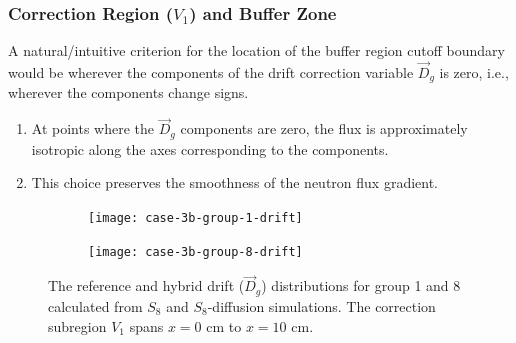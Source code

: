 \begin{frame}
  \frametitle{Correction Region ($V_1$) and Buffer Zone}

  A natural/intuitive criterion for the location of the buffer region cutoff boundary
  would be wherever the components of the drift correction variable $\vec{D}_g$ is zero, i.e.,
  wherever the components change signs.
  \begin{enumerate}
    \item At points where the $\vec{D}_g$ components are zero, the flux is approximately isotropic
      along the axes corresponding to the components.
    \item This choice preserves the smoothness of the neutron flux gradient.
  \end{enumerate}
  \begin{figure}[htb!]
      \centering
      \begin{subfigure}[t]{.46\textwidth}
          \centering
          \texttt{[image: case-3b-group-1-drift]}
      \end{subfigure}
      \hfill
      \begin{subfigure}[t]{.46\textwidth}
          \centering
          \texttt{[image: case-3b-group-8-drift]}
      \end{subfigure}
      \caption{The reference and hybrid drift ($\vec{D}_g$) distributions for group 1 and 8 calculated
        from $S_8$ and $S_8$-diffusion simulations. The correction subregion $V_1$ spans $x=0$ cm to
        $x=10$ cm.}
      \label{fig:3b-drift-1}
  \end{figure}
\end{frame}

